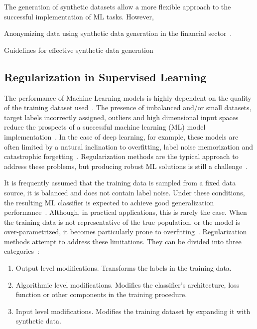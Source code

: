 \documentclass[parskip=full]{scrartcl}
\begin{document}
The generation of synthetic datasets allow a more flexible approach to the
successful implementation of ML tasks. However,

Anonymizing data using synthetic data generation in the financial
sector~\cite{assefa2020generating}.

Guidelines for effective synthetic data generation~\cite{dankar2021fake}





\subsection{Regularization in Supervised Learning}

The performance of Machine Learning models is highly dependent on the quality
of the training dataset used~\cite{Fenza2021, Halevy2009}. The presence of
imbalanced and/or small datasets, target labels incorrectly assigned, outliers
and high dimensional input spaces reduce the prospects of a successful machine
learning (ML) model implementation~\cite{Halevy2009, Domingos2012,
Salman2019}. In the case of deep learning, for example, these
models are often limited by a natural inclination to overfitting, label noise
memorization and catastrophic forgetting~\cite{Xie2021}. Regularization
methods are the typical approach to address these problems, but producing
robust ML solutions is still a challenge~\cite{Zhang2021}.

It is frequently assumed that the training data is sampled from a fixed data
source, it is balanced and does not contain label noise. Under these
conditions, the resulting ML classifier is expected to achieve good
generalization performance~\cite{benning2018modern}. Although, in practical
applications, this is rarely the case. When the training data is not
representative of the true population, or the model is over-parametrized, it
becomes particularly prone to overfitting~\cite{Bartlett2021}. Regularization
methods attempt to address these limitations. They can be divided into three
categories~\cite{santos2022avoiding}:

\begin{enumerate}
    \item Output level modifications. Transforms the labels in the training
        data.
    \item Algorithmic level modifications. Modifies the classifier's
        architecture, loss function or other components in the training
        procedure.
    \item Input level modifications. Modifies the training dataset by expanding it
        with synthetic data.
\end{enumerate}
\end{document}
